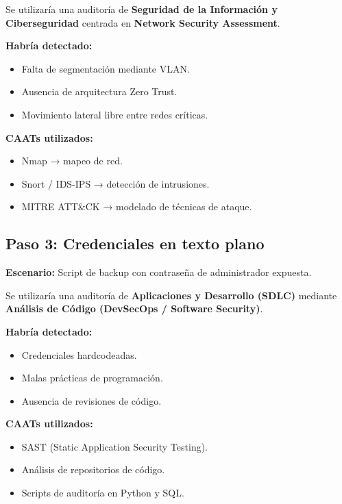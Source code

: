 \documentclass[11pt,a4paper]{article}
\begin{document}
Se utilizaría una auditoría de \textbf{Seguridad de la Información y Ciberseguridad} centrada en \textbf{Network Security Assessment}.

\textbf{Habría detectado:}

\begin{itemize}
    \item Falta de segmentación mediante VLAN.
    \item Ausencia de arquitectura Zero Trust.
    \item Movimiento lateral libre entre redes críticas.
\end{itemize}

\textbf{CAATs utilizados:}

\begin{itemize}
    \item Nmap → mapeo de red.
    \item Snort / IDS-IPS → detección de intrusiones.
    \item MITRE ATT\&CK → modelado de técnicas de ataque.
\end{itemize}


\subsection{Paso 3: Credenciales en texto plano}

\textbf{Escenario:} Script de backup con contraseña de administrador expuesta.

Se utilizaría una auditoría de \textbf{Aplicaciones y Desarrollo (SDLC)} mediante \textbf{Análisis de Código (DevSecOps / Software Security)}.

\textbf{Habría detectado:}

\begin{itemize}
    \item Credenciales hardcodeadas.
    \item Malas prácticas de programación.
    \item Ausencia de revisiones de código.
\end{itemize}

\textbf{CAATs utilizados:}

\begin{itemize}
    \item SAST (Static Application Security Testing).
    \item Análisis de repositorios de código.
    \item Scripts de auditoría en Python y SQL.
\end{itemize}
\end{document}
